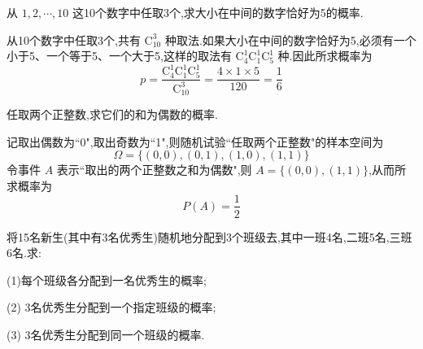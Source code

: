 \question 从 $1,2,\cdots,10$ 这10个数字中任取3个,求大小在中间的数字恰好为5的概率.

\begin{solution}
    从10个数字中任取3个,共有 $\mathrm{C}_{10}^3$ 种取法.如果大小在中间的数字恰好为5,必须有一个小于5、一个等于5、一个大于5,这样的取法有 $\mathrm{C}_4^1 \mathrm{C}_1^1 \mathrm{C}_5^1$ 种.因此所求概率为
    $$
    p = \dfrac{\mathrm{C}_4^1 \mathrm{C}_1^1 \mathrm{C}_5^1}{\mathrm{C}_{10}^3} = \dfrac{4 \times 1 \times 5}{120} = \dfrac{1}{6}
    $$
\end{solution}

\question 任取两个正整数,求它们的和为偶数的概率.

\begin{solution}
    记取出偶数为``0",取出奇数为``1",则随机试验``任取两个正整数"的样本空间为
    $$
    \varOmega = \{ (0,0), (0,1), (1,0), (1,1) \}
    $$
    令事件 $A$ 表示``取出的两个正整数之和为偶数",则 $A = \{ (0,0), (1,1) \}$,从而所求概率为 $$P(A) = \dfrac{1}{2}$$
\end{solution}

\question 将15名新生(其中有3名优秀生)随机地分配到3个班级去,其中一班4名,二班5名,三班6名.求:

(1)每个班级各分配到一名优秀生的概率;

(2) 3名优秀生分配到一个指定班级的概率;

(3) 3名优秀生分配到同一个班级的概率.

